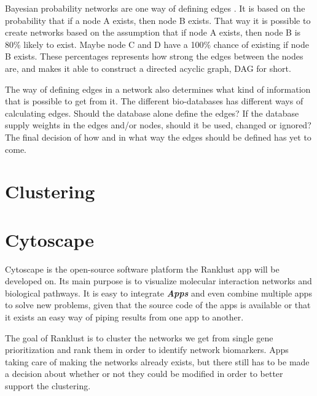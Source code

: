 \documentclass[UKenglish,11pt,a4paper]{article}
\begin{document}
Bayesian probability networks are one way of defining edges \cite{bayesiannetworks}. It is based on the probability that
if a node A exists, then node B exists. That way it is possible to create networks based on the assumption that if node
A exists, then node B is 80\% likely to exist. Maybe node C and D have a 100\% chance of existing if node B exists.
These percentages represents how strong the edges between the nodes are, and makes it able to construct a directed
acyclic graph, DAG for short.

The way of defining edges in a network also determines what kind of information that is possible to get from it. The
different bio-databases has different ways of calculating edges. Should the database alone define the edges? If the
database supply weights in the edges and/or nodes, should it be used, changed or ignored? The final decision of how and
in what way the edges should be defined has yet to come. 
\section{Clustering}
\section{Cytoscape}
Cytoscape is the open-source software platform the Ranklust app will be developed on. Its main purpose is to visualize
molecular interaction networks and biological pathways.  It is easy to integrate \textbf{\textit{Apps}} and even combine 
multiple apps to solve new problems, given that the source code of the apps is available or that it exists an easy way of 
piping results from one app to another. 

The goal of Ranklust is to cluster the networks we get from single gene prioritization and rank them in order to 
identify network biomarkers. Apps taking care of making the networks already exists, but there still has to be made a 
decision about whether or not they could be modified in order to better support the clustering.
\end{document}
